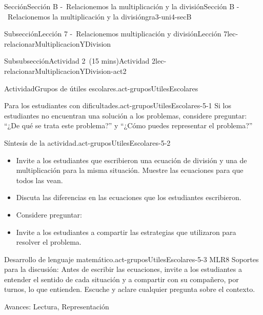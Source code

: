 \documentclass[oneside,10pt,]{article}
\newlength{\fillinmaxwidth}
\newlength{\fillincontract}
\newlength{\charmaxwidth}\setlength{\charmaxwidth}{0.5em}
\newlength{\charminwidth}\setlength{\charminwidth}{0.1em}
\newlength{\fillinheight}
\newcommand{\fillintext}[1]{%
\setlength{\fillinmaxwidth}{#1\charmaxwidth}%
\setlength{\fillincontract}{#1\charminwidth}%
\setlength{\fillinheight}{\baselineskip}\addtolength{\fillinheight}{1.2pt}%
\strut\nobreak\leaders\vbox{\hrule width 0.3pt height 0.3pt \vskip -1.2pt}\hskip 1\fillinmaxwidth minus \fillincontract\nobreak\strut%
}
\begin{document}
\begin{sectionptx}{Sección}{Sección B -~Relacionemos la multiplicación y la división}{}{Sección B -~Relacionemos la multiplicación y la división}{}{}{gra3-uni4-secB}
\begin{subsectionptx}{Subsección}{Lección 7 -~Relacionemos multiplicación y división}{}{Lección 7}{}{}{lec-relacionarMultiplicacionYDivision}
\begin{subsubsectionptx}{Subsubsección}{Actividad 2~(15 mins)}{}{Actividad 2}{}{}{lec-relacionarMultiplicacionYDivision-act2}
\begin{activity}{Actividad}{Grupos de útiles escolares.}{act-gruposUtilesEscolares}
\begin{enumerate}
\begin{enumerate}
\end{enumerate}
%
\end{enumerate}
\end{activity}%
\par
\begin{paragraphs}{Para los estudiantes con dificultades.}{act-gruposUtilesEscolares-5-1}%
Si los estudiantes no encuentran una solución a los problemas, considere preguntar: ``¿De qué se trata este problema?'' y ``¿Cómo puedes representar el problema?''%
\end{paragraphs}%
\begin{paragraphs}{Síntesis de la actividad.}{act-gruposUtilesEscolares-5-2}%
%
\begin{itemize}[label=\textbullet]
\item{}Invite a los estudiantes que escribieron una ecuación de división y una de multiplicación para la misma situación. Muestre las ecuaciones para que todos las vean.%
\item{}Discuta las diferencias en las ecuaciones que los estudiantes escribieron.%
\item{}Considere preguntar:%
%
\item{}Invite a los estudiantes a compartir las estrategias que utilizaron para resolver el problema.%
\end{itemize}
\end{paragraphs}%
\begin{paragraphs}{Desarrollo de lenguaje matemático.}{act-gruposUtilesEscolares-5-3}%
MLR8 Soportes para la discusión: Antes de escribir las ecuaciones, invite a los estudiantes a entender el sentido de cada situación y a compartir con su compañero, por turnos, lo que entienden. Escuche y aclare cualquier pregunta sobre el contexto.%
\par
Avances: Lectura, Representación%

\end{paragraphs}
\end{subsubsectionptx}
\end{subsectionptx}
\end{sectionptx}
\end{document}
